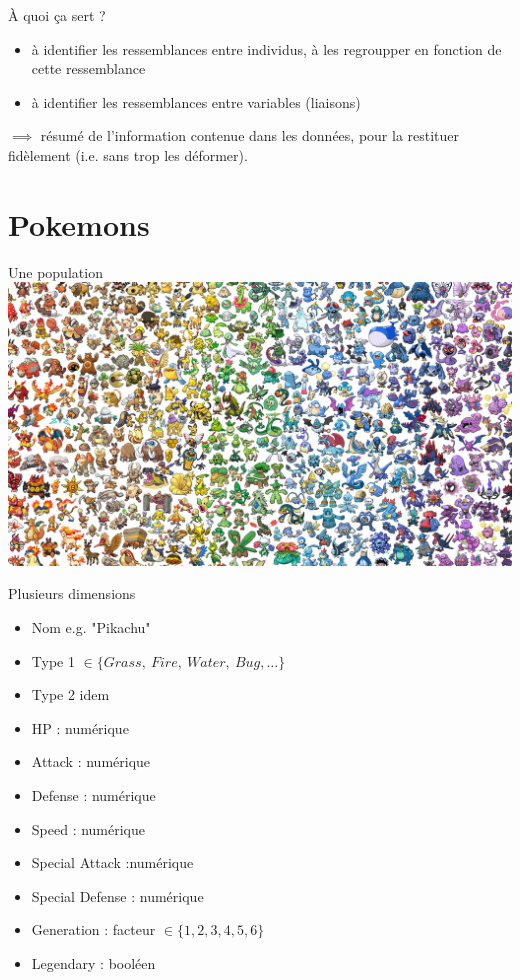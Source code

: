 \documentclass{beamer}
\begin{document}
\begin{frame}{À quoi ça sert ?}

\begin{itemize}
  \item à identifier les \alert{ressemblances} entre \alert{individus}, à les \alert{regroupper} en fonction de cette ressemblance
  \item à identifier les \alert{ressemblances} entre \alert{variables} (liaisons)
\end{itemize}


$\implies$ résumé de l'information contenue dans les données, pour la restituer \alert{fidèlement} (i.e. sans trop les déformer).

\end{frame}


\section{Pokemons}

\begin{frame}{Une population}
\centering
\includegraphics[width=\textwidth,keepaspectratio]{img/pokemons.jpeg}
\end{frame}

\begin{frame}{Plusieurs dimensions}
\centering
\begin{itemize}
	\item Nom e.g. "Pikachu"
	\item Type 1 $\in\{Grass,\ Fire,\ Water,\ Bug, \dots \}$
	\item Type 2 idem
	\item HP : numérique 
	\item Attack : numérique 
	\item Defense : numérique 
	\item Speed : numérique 
	\item Special Attack :numérique 
	\item Special Defense  : numérique
	\item Generation : facteur $\in \{1,2,3,4,5,6\}$
	\item Legendary : booléen
\end{itemize}

\end{frame}
\end{document}
